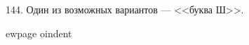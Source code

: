 144. Один из возможных вариантов --- <<буква Ш>>.
\begin{center}
\begin{figure}[ht!]
\end{figure}
\end{center}
ewpage
oindent
